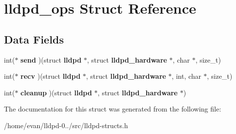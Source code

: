 \section{lldpd\-\_\-ops \-Struct \-Reference}
\label{structlldpd__ops}
\subsection*{\-Data \-Fields}
\begin{DoxyCompactItemize}
\item 
int($\ast$ {\bfseries send} )(struct {\bf lldpd} $\ast$, struct {\bf lldpd\-\_\-hardware} $\ast$, char $\ast$, size\-\_\-t)\label{structlldpd__ops_ab1a2e9880708483cb12a63c6dc6d664d}

\item 
int($\ast$ {\bfseries recv} )(struct {\bf lldpd} $\ast$, struct {\bf lldpd\-\_\-hardware} $\ast$, int, char $\ast$, size\-\_\-t)\label{structlldpd__ops_a406bf13ce1868793ef8b6b61149bc777}

\item 
int($\ast$ {\bfseries cleanup} )(struct {\bf lldpd} $\ast$, struct {\bf lldpd\-\_\-hardware} $\ast$)\label{structlldpd__ops_a1302f5eb3f8f5e98c956b4b05e5d66db}

\end{DoxyCompactItemize}


\-The documentation for this struct was generated from the following file\-:\begin{DoxyCompactItemize}
\item 
/home/evan/lldpd-\/0../src/lldpd-\/structs.\-h\end{DoxyCompactItemize}
